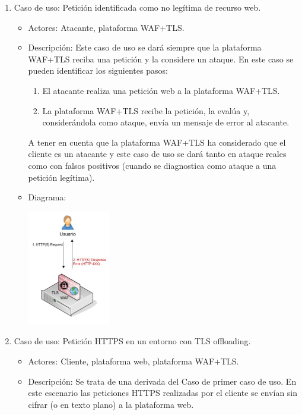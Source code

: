 \begin{enumerate}
\begin{itemize}
\begin{center}
        \end{center}
    \end{itemize}
\clearpage
  \item Caso de uso: Petición identificada como no legítima de recurso web.
    \begin{itemize}
      \item Actores: \Gls{Atacante}, plataforma WAF+TLS.
      \item Descripción: Este caso de uso se dará siempre que la plataforma WAF+TLS reciba una petición y la considere un ataque. En este caso se pueden identificar los siguientes pasos:
        \begin{enumerate}
          \item El atacante realiza una petición web a la plataforma WAF+TLS.
          \item La plataforma WAF+TLS recibe la petición, la evalúa y, considerándola como ataque, envía un mensaje de error al atacante.
        \end{enumerate}
        \par A tener en cuenta que la plataforma WAF+TLS ha considerado que el cliente es un atacante y este caso de uso se dará tanto en ataque reales como con falsos positivos (cuando se diagnostica como ataque a una
        petición legítima).
      \item Diagrama:
        \begin{center}
          \label{fig:CasoUso2}
          \includegraphics[width=0.3\textwidth]{fig/UseCase2}
        \end{center}
    \end{itemize}
\clearpage
  \item Caso de uso: Petición HTTPS en un entorno con TLS offloading.
    \begin{itemize}
      \item Actores: Cliente, plataforma web, plataforma WAF+TLS.
      \item Descripción: Se trata de una derivada del Caso de primer caso de uso. En este escenario las peticiones HTTPS realizadas por el cliente se envían sin cifrar (o en texto plano) a la plataforma web.

\end{itemize}
\end{enumerate}
